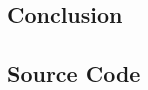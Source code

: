 \documentclass{thesis}
\begin{document}
\section{Conclusion}


\begin{appendices}

\chapter{Source Code}

\end{appendices}



\renewcommand{\thechapter}{0} %

\end{document}
